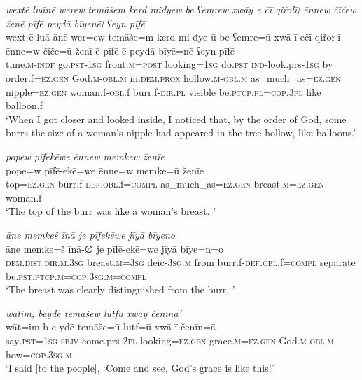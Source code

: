 \ea \label{ZQ.39}
\textit{wextē luānē werew temāšem kerd miđyew be ʕemrew xwāy e čī qiřolī| ēnnew čīčew ženē pīfē peydā bīyenē| ʕeyn pīfē} \\ 
\gll wext-ē luā-ānē wer=ew temāše=m kerd mi-đye-ū be ʕemre=ū xwā-ī ečī qiřoɫ-ī ēnne=w čīče=ū ženī-ē pīfē-ē peydā bīyē=nē ʕeyn pīfē \\ 
 time\textsc{.m}\textsc{-indf} go\textsc{.pst}\textsc{-\textsc{1sg}} front\textsc{.m}\textsc{=\textsc{post}} looking\textsc{=\textsc{1sg}} do\textsc{.pst} \textsc{ind-}look.prs\textsc{-\textsc{1sg}} by order.f\textsc{=ez.gen} God\textsc{.m}\textsc{-obl}\textsc{.m} in.\textsc{dem.prox} hollow\textsc{.m}\textsc{-obl}\textsc{.m} as\_much\_as\textsc{=ez.gen} nipple\textsc{=ez.gen} woman.f\textsc{-obl}.f burr.f\textsc{-dir}\textsc{.pl} visible be\textsc{.ptcp}\textsc{.pl}\textsc{=cop}\textsc{.3pl} like balloon.f \\ 
\glt `When I got closer and looked inside, I noticed that, by the order of God, some burrs the size of a woman's nipple had appeared in the tree hollow, like balloons.'
\z 
 
\ea \label{ZQ.40}
\textit{popew pīfekēwe ēnnew memkew ženīe} \\ 
\gll pope=w pīfē-ekē=we ēnne=w memke=ū ženīe \\ 
 top\textsc{=ez.gen} burr.f\textsc{-def}\textsc{.obl}.f\textsc{=compl} as\_much\_as\textsc{=ez.gen} breast\textsc{.m}\textsc{=ez.gen} woman.f \\ 
\glt `The top of the burr was like a woman’s breast. '
\z 
 
\ea \label{ZQ.41}
\textit{āne memkeš īnā je pīfekēwe jīyā bīyeno} \\ 
\gll āne memke=š īnā-∅ je pīfē-ekē=we jīyā bīye=n=o \\ 
 \textsc{dem.dist}\textsc{.dir}\textsc{.m}\textsc{.3sg} breast\textsc{.m}\textsc{=3sg} deic\textsc{-3sg}\textsc{.m} from burr.f\textsc{-def}\textsc{.obl}.f\textsc{=compl} separate be\textsc{.pst}\textsc{.ptcp}\textsc{.m}\textsc{=cop}\textsc{.3sg}\textsc{.m}\textsc{=compl} \\ 
\glt `The breast was clearly distinguished from the burr. '
\z 
 
\ea \label{ZQ.46}
\textit{wātim, beydē temāšew lutfū xwāy čenīnā’} \\ 
\gll wāt=im b-e-ydē temāše=ū lutf=ū xwā-ī čenīn=ā \\ 
 say\textsc{.pst}\textsc{=\textsc{1sg}} \textsc{sbjv-}come.prs-\textsc{2pl} looking\textsc{=ez.gen} grace\textsc{.m}\textsc{=ez.gen} God\textsc{.m}\textsc{-obl}\textsc{.m} how\textsc{=cop}\textsc{.3sg}\textsc{.m} \\ 
\glt `I said [to the people], ‘Come and see, God’s grace is like this!'
\z 
 

